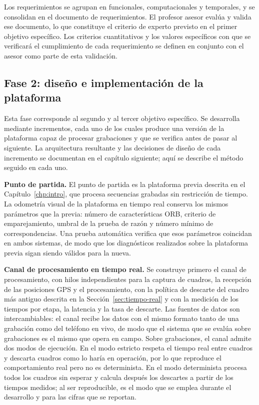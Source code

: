 Los requerimientos se agrupan en funcionales, computacionales y temporales, y se consolidan en el documento de requerimientos.
El profesor asesor evalúa y valida ese documento, lo que constituye el criterio de experto previsto en el primer objetivo específico.
Los criterios cuantitativos y los valores específicos con que se verificará el cumplimiento de cada requerimiento se definen en conjunto con el asesor como parte de esta validación.

\subsection{Fase 2: diseño e implementación de la plataforma}
\label{sec:met-fase2}

Esta fase corresponde al segundo y al tercer objetivo específico.
Se desarrolla mediante incrementos, cada uno de los cuales produce una versión de la plataforma capaz de procesar grabaciones y que se verifica antes de pasar al siguiente.
La arquitectura resultante y las decisiones de diseño de cada incremento se documentan en el capítulo siguiente; aquí se describe el método seguido en cada uno.

\textbf{Punto de partida.}
El punto de partida es la plataforma previa descrita en el Capítulo~\ref{chp:intro}, que procesa secuencias grabadas sin restricción de tiempo.
La odometría visual de la plataforma en tiempo real conserva los mismos parámetros que la previa: número de características ORB, criterio de emparejamiento, umbral de la prueba de razón y número mínimo de correspondencias.
Una prueba automática verifica que esos parámetros coincidan en ambos sistemas, de modo que los diagnósticos realizados sobre la plataforma previa sigan siendo válidos para la nueva.

\textbf{Canal de procesamiento en tiempo real.}
Se construye primero el canal de procesamiento, con hilos independientes para la captura de cuadros, la recepción de las posiciones GPS y el procesamiento, con la política de descarte del cuadro más antiguo descrita en la Sección~\ref{sec:tiempo-real} y con la medición de los tiempos por etapa, la latencia y la tasa de descarte.
Las fuentes de datos son intercambiables: el canal recibe los datos con el mismo formato tanto de una grabación como del teléfono en vivo, de modo que el sistema que se evalúa sobre grabaciones es el mismo que opera en campo.
Sobre grabaciones, el canal admite dos modos de ejecución.
En el modo estricto respeta el tiempo real entre cuadros y descarta cuadros como lo haría en operación, por lo que reproduce el comportamiento real pero no es determinista.
En el modo determinista procesa todos los cuadros sin esperar y calcula después los descartes a partir de los tiempos medidos; al ser reproducible, es el modo que se emplea durante el desarrollo y para las cifras que se reportan.

